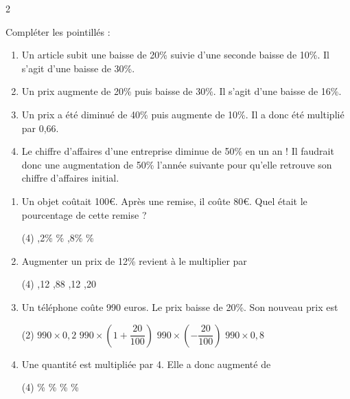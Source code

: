 \documentclass[10pt,a4paper]{article}
\begin{document}
\begin{multicols}{2}
\begin{exo}
Compléter les pointillés :




\end{exo}


\begin{exo}
    \begin{enumerate}
        \item Un article subit une baisse de 20\% suivie d'une seconde baisse de 10\%. Il s'agit d'une baisse de 30\%.
        \item Un prix augmente de 20\% puis baisse de 30\%. Il s'agit d'une baisse de 16\%.
        \item Un prix a été diminué de 40\% puis augmente de 10\%. Il a donc été multiplié par 0,66.
        \item Le chiffre d'affaires d'une entreprise diminue de 50\% en un an ! Il faudrait donc une augmentation de 50\% l'année suivante pour qu'elle retrouve son chiffre d'affaires initial.
    \end{enumerate}
\end{exo}

\begin{exo}[QCM][bac]

\begin{enumerate}
    \item Un objet coûtait 100\euro. Après une remise, il coûte 80\euro. Quel était le pourcentage de cette remise ?
    \begin{tasks}(4)
      ,2\%
      \%
      ,8\%
      \%
    \end{tasks}
    \item Augmenter un prix de 12\% revient à le multiplier par \begin{tasks}(4)
        ,12
        ,88
        ,12
        ,20
    \end{tasks}
    \item Un téléphone coûte 990 euros. Le prix baisse de 20\%. Son nouveau prix est \begin{tasks}(2)
        \task \(990\times 0,2\)
        \task \(990\times \left( 1+\dfrac{20}{100} \right)\)
        \task \(990\times \left( -\dfrac{20}{100} \right)\)
        \task \(990\times 0,8\)
    \end{tasks}
    \item Une quantité est multipliée par 4. Elle a donc augmenté de \begin{tasks}(4)
        \%
        \%
        \%
        \%
    \end{tasks}
\end{enumerate}
\end{exo}


\end{multicols}
\end{document}
